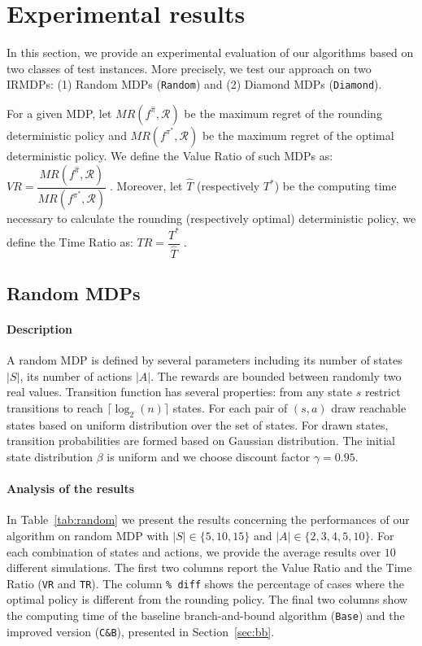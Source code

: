 \section{Experimental results}\label{sec:experiments}

In this section, we provide an experimental evaluation of our algorithms based on two classes of test instances. More precisely, we test our approach on two IRMDPs: (1) Random MDPs (\texttt{Random})  and (2) Diamond MDPs (\texttt{Diamond}).

For a given MDP, let $MR(f^{\hat{\pi}}, \mathcal{R})$ be the maximum regret of the rounding deterministic policy and $MR(f^{\pi^*}, \mathcal{R})$  be the maximum regret of the optimal deterministic policy. We define the Value Ratio of such MDPs as: $VR = \dfrac{MR(f^{\hat{\pi}}, \mathcal{R})}{MR(f^{\pi^*}, \mathcal{R})}\;$.
Moreover, let $\hat{T}$ (respectively $T^*$) be the computing time necessary to calculate the rounding (respectively optimal) deterministic policy, we define the Time Ratio as: $TR=\dfrac{T^*}{\hat{T}}\;$.
  
\subsection{Random MDPs}
\paragraph{Description}
A random MDP is defined by several parameters including its number of states $|S|$, its number of actions $|A|$. The rewards are bounded between randomly two real values. Transition function has several properties: from any state $s$ restrict transitions to reach $\lceil \log_2(n) \rceil$ states. For each pair of $(s, a)$ draw reachable states based on uniform distribution over the set of states. For drawn states, transition probabilities are formed based on Gaussian distribution. The initial state distribution $\beta$ is uniform and we choose discount factor $\gamma = 0.95$. 
\paragraph{Analysis of the results}
In Table~\ref{tab:random} we present the results concerning the performances of our algorithm on random MDP with $|S| \in \{5,10,15\}$ and $|A| \in \{2, 3, 4, 5, 10\}$. For each combination of states and actions, we provide the average results over $10$ different simulations. The first two columns report the Value Ratio and the Time Ratio (\texttt{VR} and \texttt{TR}). The column \texttt{\% diff} shows the percentage of cases where the optimal policy is different from the rounding policy. The final two columns show the computing time of the baseline branch-and-bound algorithm (\texttt{Base}) and the improved version (\texttt{C\&B}), presented in Section~\ref{sec:bb}.

